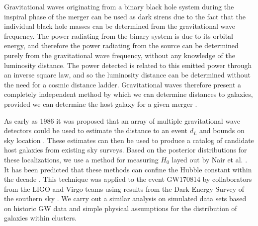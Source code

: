 Gravitational waves originating from a binary black hole system during the inspiral phase of the merger can be used as dark sirens due to the fact that the individual black hole masses can be determined from the gravitational wave frequency.
The power radiating from the binary system is due to its orbital energy, and therefore the power radiating from the source can be determined purely from the gravitational wave frequency, without any knowledge of the luminosity distance.
The power detected is related to this emitted power through an inverse square law, and so the luminosity distance can be determined without the need for a cosmic distance ladder.
Gravitational waves therefore present a completely independent method by which we can determine distances to galaxies, provided we can determine the host galaxy for a given merger \cite{GW170814_DES,GW170817_H0,Nair_2018}.

As early as 1986 it was proposed that an array of multiple gravitational wave detectors could be used to estimate the distance to an event $d_L$ and bounds on sky location \cite{Schutz_1986}.
These estimates can then be used to produce a catalog of candidate host galaxies from existing sky surveys.
Based on the posterior distributions for these localizations, we use a method for measuring $H_0$ layed out by Nair et al. \cite{Nair_2018}.
It has been predicted that these methods can confine the Hubble constant within the decade \cite{Chen_2018}.
This technique was applied to the event GW170814 by collaborators from the LIGO and Virgo teams using results from the Dark Energy Survey of the southern sky \cite{GW170814_DES}.
We carry out a similar analysis on simulated data sets based on historic GW data and simple physical assumptions for the distribution of galaxies within clusters.

